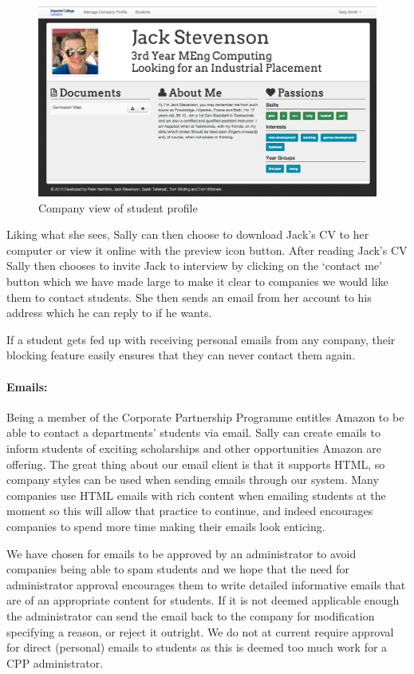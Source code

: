     \begin{figure}[H]\centering
    \includegraphics[scale=0.3]{images/user_experiences/company/jack_profile}
    \caption{Company view of student profile}
    \end{figure}

    Liking what she sees, Sally can then choose to download Jack's CV to her computer or view it online with the preview icon button. After reading Jack's CV Sally then chooses to invite Jack to interview by clicking on the `contact me' button which we have made large to make it clear to companies we would like them to contact students. She then sends an email from her account to his address which he can reply to if he wants. 

    If a student gets fed up with receiving personal emails from any company, their blocking feature easily ensures that they can never contact them again.

  \paragraph{Emails:}
    Being a member of the Corporate Partnership Programme entitles Amazon to be able to contact a departments' students via email. Sally can create emails to inform students of exciting scholarships and other opportunities Amazon are offering. The great thing about our email client is that it supports HTML, so company styles can be used when sending emails through our system. Many companies use HTML emails with rich content when emailing students at the moment so this will allow that practice to continue, and indeed encourages companies to spend more time making their emails look enticing.

    We have chosen for emails to be approved by an administrator to avoid companies being able to spam students and we hope that the need for administrator approval encourages them to write detailed informative emails that are of an appropriate content for students. If it is not deemed applicable enough the administrator can send the email back to the company for modification specifying a reason, or reject it outright.
    We do not at current require approval for direct (personal) emails to students as this is deemed too much work for a CPP administrator.



